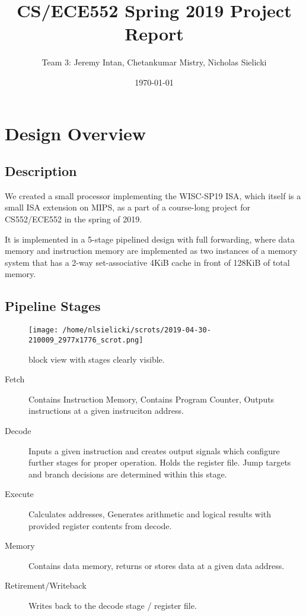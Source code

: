 \documentclass[11pt]{article}
\author{Team 3: Jeremy Intan, Chetankumar Mistry, Nicholas Sielicki}
\date{\today}
\title{CS/ECE552 Spring 2019 Project Report}
\begin{document}
\maketitle
\tableofcontents

\pagebreak

\section{Design Overview}
\label{sec:orgbdbae2f}

\subsection{Description}
\label{sec:org738903c}

We created a small processor implementing the WISC-SP19 ISA, which
itself is a small ISA extension on MIPS, as a part of a course-long
project for CS552/ECE552 in the spring of 2019.

It is implemented in a 5-stage pipelined design with full forwarding,
where data memory and instruction memory are implemented as two
instances of a memory system that has a 2-way set-associative 4KiB
cache in front of 128KiB of total memory.

\subsection{Pipeline Stages}
\label{sec:orge598361}

\begin{figure}[htbp]
\centering
\texttt{[image: /home/nlsielicki/scrots/2019-04-30-210009\_2977x1776\_scrot.png]}
\caption{block view with stages clearly visible.}
\end{figure}


\begin{description}
\item[{Fetch}] Contains Instruction Memory, Contains Program Counter,
Outputs instructions at a given instruciton address.
\item[{Decode}] Inputs a given instruction and creates output signals
which configure further stages for proper operation. Holds the
register file. Jump targets and branch decisions are determined
within this stage.
\item[{Execute}] Calculates addresses, Generates arithmetic and logical
results with provided register contents from decode.
\item[{Memory}] Contains data memory, returns or stores data at a given
data address.
\item[{Retirement/Writeback}] Writes back to the decode stage / register
file.
\end{description}
\end{document}
